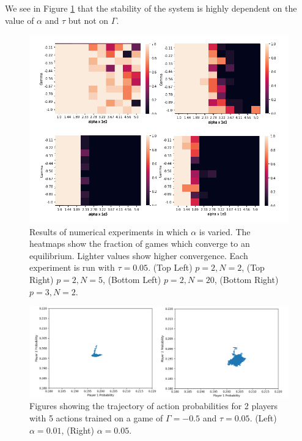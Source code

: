 \documentclass[sigconf,anonymous]{aamas}
\begin{document}
We see in Figure \ref{fig:NumericalExperiments} that the stability of the system is highly dependent on
the value of $\alpha$ and $\tau$ but not on $\Gamma$.
   
\begin{figure}[t]
    \includegraphics[width = 1.2 \linewidth, center]{Figures/Experiments.png}
    \caption{Results of numerical experiments in which $\alpha$ is varied. The heatmaps show the fraction of games which converge to an equilibrium. Lighter values show higher convergence. Each experiment is run with $\tau = 0.05$. (Top Left) $p = 2, N = 2$, (Top Right) $p = 2, N = 5$, (Bottom Left) $p = 2, N = 20$, (Bottom Right) $p=3, N = 2$.}
    \label{fig:NumericalExperiments}
\end{figure}

\begin{figure}[t]
    \includegraphics[width = 1.1 \linewidth, center]{Figures/a5e2var.png}
    \caption{Figures showing the trajectory of action probabilities for 2 players with 5 actions trained on a game of $\Gamma = -0.5$ and $\tau = 0.05$. (Left) $\alpha = 0.01$, (Right) $\alpha = 0.05$.}
    \label{fig:AlphaVariation}
\end{figure}
\end{document}
